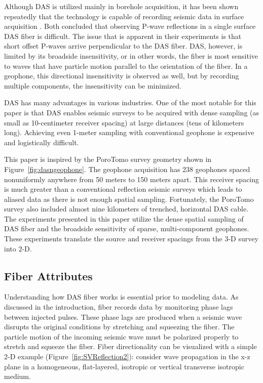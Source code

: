 Although DAS is utilized mainly in borehole acquisition, it has been shown repeatedly that the technology is capable of recording seismic data in surface acquisition \citep{daley2013field,yavuz2016subsurface,jreij2018improving}. Both \citet{daley2013field,yavuz2016subsurface} concluded that observing P-wave reflections in a single surface DAS fiber is difficult. The issue that is apparent in their experiments is that short offset P-waves arrive perpendicular to the DAS fiber. DAS, however, is limited by its broadside insensitivity, or in other words, the fiber is most sensitive to waves that have particle motion parallel to the orientation of the fiber. In a geophone, this directional insensitivity is observed as well, but by recording multiple components, the insensitivity can be minimized.

DAS has many advantages in various industries. One of the most notable for this paper is that DAS enables seismic surveys to be acquired with dense sampling (as small as 10-centimeter receiver spacing) at large distances (tens of kilometers long). Achieving even 1-meter sampling with conventional geophone is expensive and logistically difficult.

This paper is inspired by the PoroTomo survey geometry shown in Figure~\ref{fig:dasngeophone}. The geophone acquisition has 238 geophones spaced nonuniformly anywhere from 50 meters to 150 meters apart. This receiver spacing is much greater than a conventional reflection seismic surveys which leads to aliased data as there is not enough spatial sampling. Fortunately, the PoroTomo survey also included almost nine kilometers of trenched, horizontal  DAS cable. The experiments presented in this paper utilize the dense spatial sampling of DAS fiber and the broadside sensitivity of sparse, multi-component geophones. These experiments translate the source and receiver spacings from the 3-D survey into 2-D.


\subsection{Fiber Attributes}
Understanding how DAS fiber works is essential prior to modeling data. As discussed in the introduction, fiber records data by monitoring phase lags between injected pulses. These phase lags are produced when a seismic wave disrupts the original conditions by stretching and squeezing the fiber. The particle motion of the incoming seismic wave must be polarized properly to stretch and squeeze the fiber. Fiber directionality can be visualized with a simple 2-D example (Figure~\ref{fig:SVReflection2}): consider wave propagation in the x-z plane in a homogeneous, flat-layered, isotropic or vertical transverse isotropic medium.

